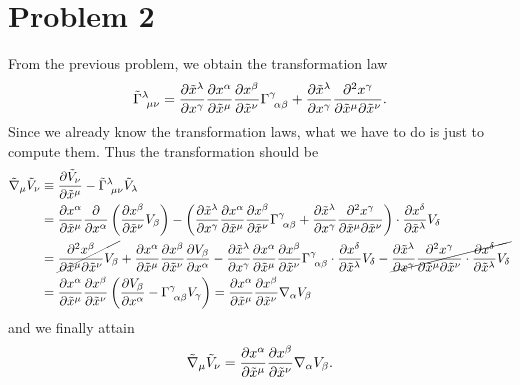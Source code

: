 \documentclass[a4paper,pdftex,10pt]{article}
\begin{document}
\section{Problem 2}

From the previous problem, we obtain the transformation law
\begin{equation}
  \tilde{\Gamma}^{\lambda}_{\ \mu\nu}
  =
  \pdv{\tilde{x}^{\lambda}}{x^{\gamma}}
  \pdv{x^{\alpha}}{\tilde{x}^{\mu}}
  \pdv{x^{\beta}}{\tilde{x}^{\nu}}
  \Gamma^{\gamma}_{\ \alpha\beta}
  +
  \pdv{\tilde{x}^{\lambda}}{x^{\gamma}}\pdv{x^{\gamma}}{\tilde{x}^{\mu}}{\tilde{x}^{\nu}}
  .
\end{equation}
Since we already know the transformation laws, what we have to do is just to compute them. Thus the transformation should be
\begin{align}
  \tilde{\nabla}_{\mu}\tilde{V}_{\nu}
   & \equiv
  \pdv{\tilde{V}_{\nu}}{\tilde{x}^{\mu}}
  -
  \tilde{\Gamma}^{\lambda}_{\ \mu\nu}\tilde{V}_{\lambda}
  \nonumber
  \\
   & =
  \pdv{x^{\alpha}}{\tilde{x}^{\mu}}\pdv{}{x^{\alpha}}\left( \pdv{x^{\beta}}{\tilde{x}^{\nu}}V_{\beta} \right)
  -
  \left(
  \pdv{\tilde{x}^{\lambda}}{x^{\gamma}}
  \pdv{x^{\alpha}}{\tilde{x}^{\mu}}
  \pdv{x^{\beta}}{\tilde{x}^{\nu}}
  \Gamma^{\gamma}_{\ \alpha\beta}
  +
  \pdv{\tilde{x}^{\lambda}}{x^{\gamma}}\pdv{x^{\gamma}}{\tilde{x}^{\mu}}{\tilde{x}^{\nu}}
  \right)
  \cdot
  \pdv{x^{\delta}}{\tilde{x}^{\lambda}}V_{\delta}
  \nonumber
  \\
   & =
  \cancel{
  \pdv{x^{\beta}}{\tilde{x}^{\mu}}{\tilde{x}^{\nu}}V_{\beta}
  }
  +
  \pdv{x^{\alpha}}{\tilde{x}^{\mu}}\pdv{x^{\beta}}{\tilde{x}^{\nu}}\pdv{V_{\beta}}{x^{\alpha}}
  -
  \pdv{\tilde{x}^{\lambda}}{x^{\gamma}}
  \pdv{x^{\alpha}}{\tilde{x}^{\mu}}
  \pdv{x^{\beta}}{\tilde{x}^{\nu}}
  \Gamma^{\gamma}_{\ \alpha\beta}
  \cdot
  \pdv{x^{\delta}}{\tilde{x}^{\lambda}}V_{\delta}
  -
  \cancel{
  \pdv{\tilde{x}^{\lambda}}{x^{\gamma}}\pdv{x^{\gamma}}{\tilde{x}^{\mu}}{\tilde{x}^{\nu}}
  \cdot
  \pdv{x^{\delta}}{\tilde{x}^{\lambda}}V_{\delta}
  }
  \nonumber
  \\
   & =
  \pdv{x^{\alpha}}{\tilde{x}^{\mu}}\pdv{x^{\beta}}{\tilde{x}^{\nu}}
  \left(
  \pdv{V_{\beta}}{x^{\alpha}}
  -
  \Gamma^{\gamma}_{\ \alpha\beta}V_{\gamma}
  \right)
  =
  \pdv{x^{\alpha}}{\tilde{x}^{\mu}}\pdv{x^{\beta}}{\tilde{x}^{\nu}}\nabla_{\alpha}V_{\beta}
\end{align}
and we finally attain
\begin{equation}
  \tilde{\nabla}_{\mu}\tilde{V}_{\nu}
  =
  \pdv{x^{\alpha}}{\tilde{x}^{\mu}}\pdv{x^{\beta}}{\tilde{x}^{\nu}}\nabla_{\alpha}V_{\beta}
  .
\end{equation}
\end{document}
